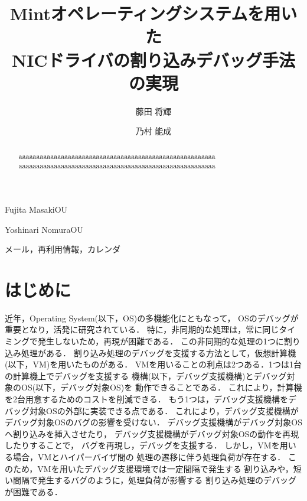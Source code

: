 \documentclass[submit,techreq,noauthor,dvipdfmx]{ipsj}
\begin{document}
\title{Mintオペレーティングシステムを用いた\\NICドライバの割り込みデバッグ手法の実現}


\author{藤田 将輝}{Fujita Masaki}{OU}
\author{乃村 能成}{Yoshinari Nomura}{OU}

\begin{abstract}
    aaaaaaaaaaaaaaaaaaaaaaaaaaaaaaaaaaaaaaaaaaaaaaaaaaaaaaaa
    aaaaaaaaaaaaaaaaaaaaaaaaaaaaaaaaaaaaaaaaaaaaaaaaaaaaaaaa
\end{abstract}

\begin{jkeyword}
    メール，再利用情報，カレンダ
\end{jkeyword}
\maketitle

\section{はじめに}

近年，Operating System(以下，OS)の多機能化にともなって，
OSのデバッグが重要となり，活発に研究されている．
特に，非同期的な処理は，常に同じタイミングで発生しないため，再現が困難である．
この非同期的な処理の1つに割り込み処理がある．
割り込み処理のデバッグを支援する方法として，仮想計算機(以下，VM)を用いたものがある．
VMを用いることの利点は2つある．1つは1台の計算機上でデバッグを支援する
機構(以下，デバッグ支援機構)とデバッグ対象のOS(以下，デバッグ対象OS)を
動作できることである．
これにより，計算機を2台用意するためのコストを削減できる．
もう1つは，デバッグ支援機構をデバッグ対象OSの外部に実装できる点である．
これにより，デバッグ支援機構がデバッグ対象OSのバグの影響を受けない．
デバッグ支援機構がデバッグ対象OSへ割り込みを挿入させたり，
デバッグ支援機構がデバッグ対象OSの動作を再現したりすることで，
バグを再現し，デバッグを支援する．
しかし，VMを用いる場合，VMとハイパーバイザ間の
処理の遷移に伴う処理負荷が存在する．
このため，VMを用いたデバッグ支援環境では一定間隔で発生する
割り込みや，短い間隔で発生するバグのように，処理負荷が影響する
割り込み処理のデバッグが困難である．
\end{document}
